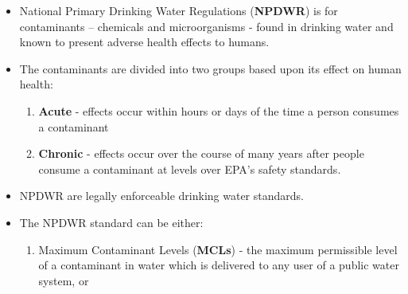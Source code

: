 \begin{itemize}
\item National Primary Drinking Water Regulations (\textbf{NPDWR})  is for contaminants – chemicals and microorganisms - found in drinking water and known to present adverse health effects to humans.
\item The contaminants are divided into two groups based upon its effect on human health:
\begin{enumerate}
\item \textbf{Acute} - effects occur within hours or days of the time a person consumes a contaminant
\item \textbf{Chronic} - effects occur over the course of many years after people consume a contaminant at levels over EPA's safety standards. 
\end{enumerate}
\item NPDWR are legally enforceable drinking water standards.  
\item The NPDWR standard can be either:
\vspace{0.3cm}
\begin{enumerate}
\item Maximum Contaminant Levels (\textbf{MCLs})  - the maximum permissible level of a contaminant in water which is delivered to any user of a public water system,  or 


\end{enumerate}
\end{itemize}
